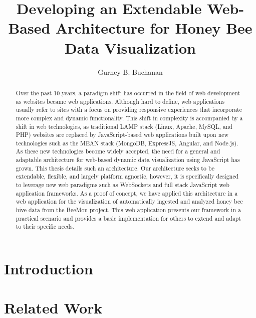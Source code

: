 \documentclass[12pt]{asu}
\title{Developing an Extendable Web-Based Architecture for Honey Bee Data Visualization}
\author{Gurney B. Buchanan}
\begin{document}
	\begin{preliminary}
		\maketitle
		\makeapproval
		\makecopyright
		\begin{abstract}
Over the past 10 years, a paradigm shift has occurred in the field of web development as websites became web applications.   Although hard to define, web applications usually refer to sites with a focus on providing responsive experiences that incorporate more complex and dynamic functionality.  This shift in complexity is accompanied by a shift in web technologies, as traditional LAMP stack (Linux, Apache, MySQL, and PHP) websites are replaced by JavaScript-based web applications built upon new technologies such as the MEAN stack (MongoDB, ExpressJS, Angular, and Node.js).  As these new technologies become widely accepted, the need for a general and adaptable architecture for web-based dynamic data visualization using JavaScript has grown.  This thesis details such an architecture. Our architecture seeks to be extendable, flexible, and largely platform agnostic, however, it is specifically designed to leverage new web paradigms such as WebSockets and full stack JavaScript web application frameworks.  As a proof of concept, we have applied this architecture in a web application for the visualization of automatically ingested and analyzed honey bee hive data from the BeeMon project.  This web application presents our framework in a practical scenario and provides a basic implementation for others to extend and adapt to their specific needs.
		\end{abstract}
		\tableofcontents
		\listoffigures
	\end{preliminary}



	\chapter[Introduction]{\centering Introduction}
    	 \label{intro}

\chapter[Related Work]{\centering Related Work} \label{relwork}
			 \label{relwork}
\end{document}
